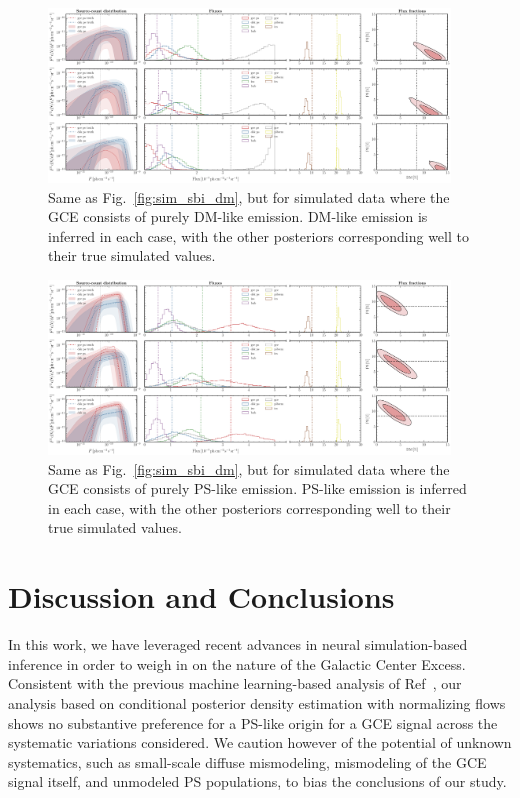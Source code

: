 \documentclass[prd,aps,10pt,nofootinbib,twocolumn,superscriptaddress,preprintnumbers,balancelastpage,longbibliography]{revtex4-1}
\begin{document}
%
\begin{figure}
    \centering
    \includegraphics[width=0.95\textwidth]{plots/sim_sbi_dm_mismo.pdf}
    \caption{Same as Fig.~\ref{fig:sim_sbi_dm}, but for simulated data where the GCE consists of purely DM-like emission. DM-like emission is inferred in each case, with the other posteriors corresponding well to their true simulated values.}
    \label{fig:sim_sbi_dm_mismo}
\end{figure}
%

%
\begin{figure}
    \centering
    \includegraphics[width=0.95\textwidth]{plots/sim_sbi_ps_mismo.pdf}
    \caption{Same as Fig.~\ref{fig:sim_sbi_dm}, but for simulated data where the GCE consists of purely PS-like emission. PS-like emission is inferred in each case, with the other posteriors corresponding well to their true simulated values.}
    \label{fig:sim_sbi_ps_mismo}
\end{figure}
%

\section{Discussion and Conclusions}
\label{sec:conclusion}

In this work, we have leveraged recent advances in neural simulation-based inference in order to weigh in on the nature of the \Fermi Galactic Center Excess. Consistent with the previous machine learning-based analysis of Ref~\cite{List:2020mzd}, our analysis based on conditional posterior density estimation with normalizing flows shows no substantive preference for a PS-like origin for a GCE signal across the systematic variations considered. We caution however of the potential of unknown systematics, such as small-scale diffuse mismodeling, mismodeling of the GCE signal itself, and unmodeled PS populations, to bias the conclusions of our study.
\end{document}
